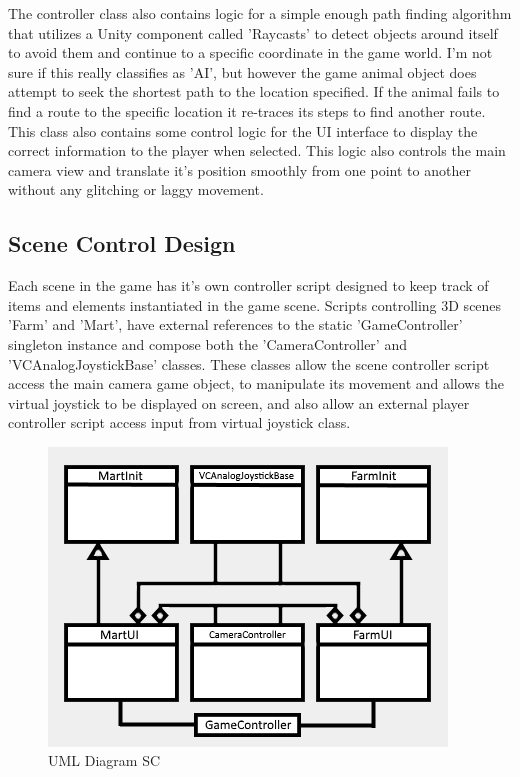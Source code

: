 The controller class also contains logic for a simple enough path finding algorithm that utilizes a Unity component called 'Raycasts' to detect objects around itself to avoid them and continue to a specific coordinate in the game world. I'm not sure if this really classifies as 'AI', but however the game animal object does attempt to seek the shortest path to the location specified. If the animal fails to find a route to the specific location it re-traces its steps to find another route.
This class also contains some control logic for the UI interface to display the correct information to the player when selected. This logic also controls the main camera view and translate it's position smoothly from one point to another without any glitching or laggy movement.
\subsection{Scene Control Design}
Each scene in the game has it's own controller script designed to keep track of items and elements instantiated in the game scene. Scripts controlling 3D scenes 'Farm' and 'Mart', have external references to the static 'GameController' singleton instance and compose both the 'CameraController' and 'VCAnalogJoystickBase' classes. These classes allow the scene controller script access the main camera game object, to manipulate its movement and allows the virtual joystick to be displayed on screen, and also allow an external player controller script access input from virtual joystick class.

\begin{figure}[!ht]
	\caption{UML Diagram SC}
	\centering
	\includegraphics{img/scene_uml.png}
\end{figure}

